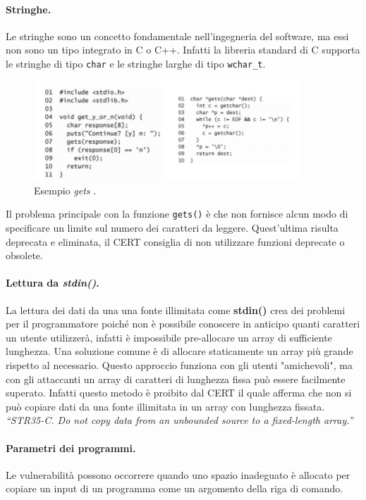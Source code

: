 \paragraph{Stringhe.}
Le stringhe sono un concetto fondamentale nell'ingegneria del software,
ma essi non sono un tipo integrato in C o C++. Infatti la libreria standard di C
supporta le stringhe di tipo \verb|char| e le stringhe larghe di tipo \verb|wchar_t|.

\begin{figure}[H]
    \centering
    \includegraphics[width=10cm, keepaspectratio]{capitoli/secure_coding/img/cap_2/gets_1.png}
    \caption{Esempio \textit{gets} .}\label{fig:gets}
\end{figure}

Il problema principale con la funzione \verb|gets()| è che non fornisce alcun modo
di specificare un limite sul numero dei caratteri da leggere.
Quest'ultima risulta deprecata e eliminata, il CERT consiglia di non utilizzare
funzioni deprecate o obsolete.

\paragraph{Lettura da \textit{stdin()}.}
La lettura dei dati da una una fonte illimitata come \textbf{stdin()} crea dei
problemi per il programmatore poiché non è possibile conoscere in anticipo quanti
caratteri un utente utilizzerà, infatti è impossibile pre-allocare un array di
sufficiente lunghezza. Una soluzione comune è di allocare staticamente un array più
grande rispetto al necessario. Questo approccio funziona con gli utenti "amichevoli",
ma con gli attaccanti un array di caratteri di lunghezza fissa può essere facilmente
superato. Infatti questo metodo è proibito dal CERT il quale afferma che non si può
copiare dati da una fonte illimitata in un array con lunghezza fissata.\\
\textit{“STR35-C. Do not copy data from an unbounded
    source to a fixed-length array.”}

\paragraph{Parametri dei programmi.}
Le vulnerabilità possono occorrere quando uno spazio inadeguato è allocato per
copiare un input di un programma come un argomento della riga di comando.

